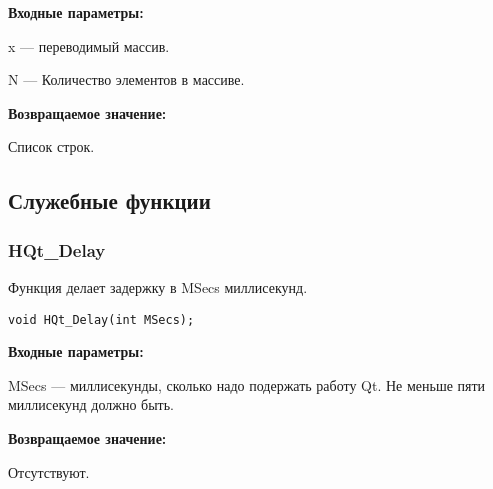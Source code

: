 \documentclass[a4paper,12pt]{article}
\begin{document}
\textbf{Входные параметры:}

x --- переводимый массив.

     N --- Количество элементов в массиве.

\textbf{Возвращаемое значение:}
 
Список строк.


\subsection{Служебные функции}

\subsubsection{HQt\_Delay}\label{HQt_Delay}

Функция делает задержку в MSecs миллисекунд.


\begin{lstlisting}[label=code_syntax_HQt_Delay,caption=Синтаксис]
void HQt_Delay(int MSecs);
\end{lstlisting}

\textbf{Входные параметры:}

MSecs --- миллисекунды, сколько надо подержать работу Qt. Не меньше пяти миллисекунд должно быть.

\textbf{Возвращаемое значение:}

Отсутствуют.

\end{document}
